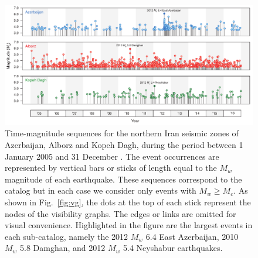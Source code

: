 \begin{figure}%
	\centering
	\includegraphics[width=\textwidth]{figures/pdf/figure-05} 
	\caption{Time-magnitude sequences for the northern Iran seismic zones of Azerbaijan, Alborz and Kopeh Dagh, during the period between 1 January 2005 and 31 December . The event occurrences are represented by vertical bars or sticks of length equal to the $M_w$ magnitude of each earthquake. These sequences correspond to the  catalog but in each case we consider only events with $M_w \geq M_c$. As shown in Fig.~\ref{fig:vg}, the dots at the top of each stick represent the nodes of the visibility graphs. The edges or links are omitted for visual convenience. Highlighted in the figure are the largest events in each sub-catalog, namely the 2012 $M_w$ 6.4 East Azerbaijan, 2010 $M_w$ 5.8 Damghan, and 2012 $M_w$ 5.4 Neyshabur earthquakes.}
	\label{fig:mag-time}
\end{figure}




